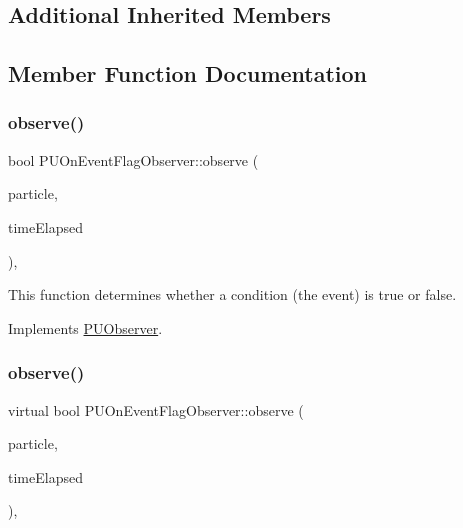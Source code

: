 \subsection*{Additional Inherited Members}


\subsection{Member Function Documentation}
\mbox{\label{classPUOnEventFlagObserver_acf9852b52ba0a7fcf2ebaf35f3dd64ee}} 
\subsubsection{\texorpdfstring{observe()}{observe()}\hspace{0.1cm}{\footnotesize\ttfamily [1/2]}}
{\footnotesize\ttfamily bool P\+U\+On\+Event\+Flag\+Observer\+::observe (\begin{DoxyParamCaption}\item[{\hyperlink{structPUParticle3D}{P\+U\+Particle3D} $\ast$}]{particle,  }\item[{float}]{time\+Elapsed }\end{DoxyParamCaption})\hspace{0.3cm}{\ttfamily [override]}, {\ttfamily [virtual]}}

This function determines whether a condition (the event) is true or false. 

Implements \hyperlink{classPUObserver_a50f59cc3245e291b641463db5d3037f7}{P\+U\+Observer}.

\mbox{\label{classPUOnEventFlagObserver_a686b31262aca58e1fd6ae83cdafa809b}} 
\subsubsection{\texorpdfstring{observe()}{observe()}\hspace{0.1cm}{\footnotesize\ttfamily [2/2]}}
{\footnotesize\ttfamily virtual bool P\+U\+On\+Event\+Flag\+Observer\+::observe (\begin{DoxyParamCaption}\item[{\hyperlink{structPUParticle3D}{P\+U\+Particle3D} $\ast$}]{particle,  }\item[{float}]{time\+Elapsed }\end{DoxyParamCaption})\hspace{0.3cm}{\ttfamily [override]}, {\ttfamily [virtual]}}

